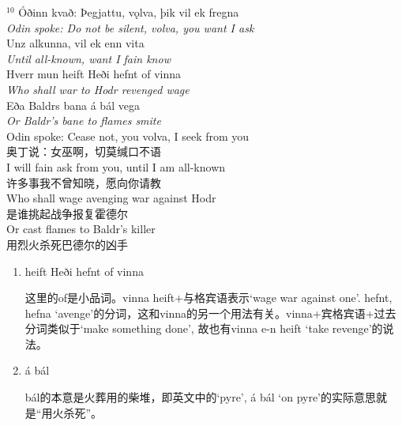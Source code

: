 \begin{paracol}{2}
  \noindent
  $^{10}$ Óðinn kvað: Þegjattu, vǫlva, þik vil ek fregna\\
  \textit{Odin spoke: Do not be silent, volva, you want I ask}\\
  Unz alkunna, vil ek enn vita\\
  \textit{Until all-known, want I fain know}\\
  Hverr mun heift Heði hefnt of vinna\\
  \textit{Who shall war to Hodr revenged wage}\\
  Eða Baldrs bana á bál vega\\
  \textit{Or Baldr's bane to flames smite}\\
  \switchcolumn
  \noindent
  Odin spoke: Cease not, you volva, I seek from you\\
  奥丁说：女巫啊，切莫缄口不语\\
  I will fain ask from you, until I am all-known\\
  许多事我不曾知晓，愿向你请教\\
  Who shall wage avenging war against Hodr\\
  是谁挑起战争报复霍德尔\\
  Or cast flames to Baldr's killer\\
  用烈火杀死巴德尔的凶手

\end{paracol}
\begin{grammar*}{}
  \begin{enumerate}[leftmargin=*]
    \item heift Heði hefnt of vinna

          这里的of是小品词。vinna heift+与格宾语表示`wage war against one'. hefnt, hefna `avenge'的分词，这和vinna的另一个用法有关。vinna+宾格宾语+过去分词类似于`make something done', 故也有vinna e-n heift `take revenge'的说法。
    \item á bál

          bál的本意是火葬用的柴堆，即英文中的`pyre', á bál `on pyre'的实际意思就是“用火杀死”。
  \end{enumerate}
\end{grammar*}

